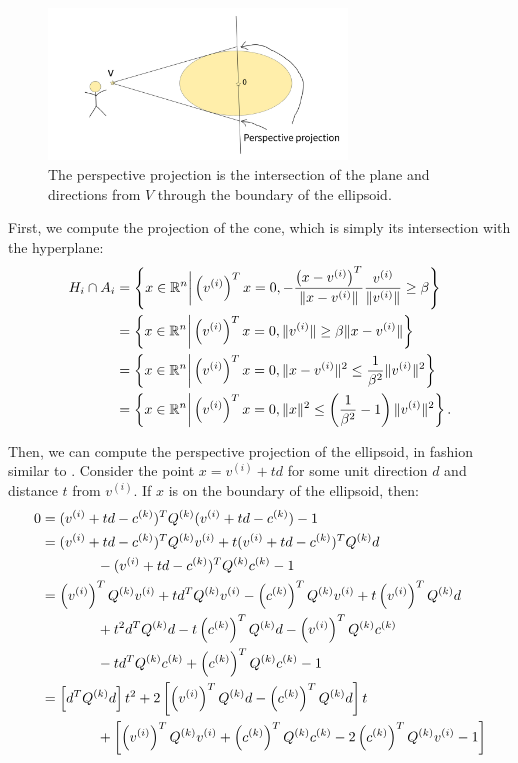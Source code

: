 \begin{figure}[ht]
    \centering
    \includegraphics[width=300px]{images/perspective_projection.png}
    \caption[A depiction of the perspective projection]{
    		The perspective projection is the intersection of the plane and directions from $V$ through the boundary of the ellipsoid.
	}
    \label{perspective_projection_depiction}
\end{figure}

First, we compute the projection of the cone, which is simply its intersection with the hyperplane:
\begin{align*}
H_i \cap A_i 
&= \left\{x \in \mathbb R^n \bigg| \left(v^{(i)}\right)^Tx = 0, -\frac{\left(x - v^{(i)}\right)^T}{\|x - v^{(i)}\|}\frac{v^{(i)}}{\|v^{(i)}\|}\ge \beta \right\} \\
&= \left\{x \in \mathbb R^n \bigg| \left(v^{(i)}\right)^Tx = 0, \|v^{(i)}\|\ge \beta\|x - v^{(i)}\| \right\} \\
&= \left\{x \in \mathbb R^n \bigg| \left(v^{(i)}\right)^Tx = 0, \|x - v^{(i)}\|^2 \le \frac 1 {\beta^2}\|v^{(i)}\|^2 \right\} \\
&= \left\{x \in \mathbb R^n \bigg| \left(v^{(i)}\right)^Tx = 0, \|x\|^2 \le \left(\frac 1 {\beta^2} - 1\right)\|v^{(i)}\|^2 \right\}.
\end{align*}

Then, we can compute the perspective projection of the ellipsoid,  in fashion similar to \cite{eberly_2013}.
Consider the point $x = v^{(i)} + td$ for some unit direction $d$ and distance $t$ from $v^{(i)}$.
If $x$ is on the boundary of the ellipsoid, then:
\begin{align*}
0 &= (v^{(i)} + t d - c^{(k)} )^T {Q^{(k)}}  (v^{(i)} + t d - c^{(k)} ) - 1\\
&= (v^{(i)} + t d - c^{(k)} )^T {Q^{(k)}}  v^{(i)} + t (v^{(i)} + t d - c^{(k)} )^T {Q^{(k)}} d \\ 
&\quad \quad \quad \quad- (v^{(i)} + t d - c^{(k)} )^T {Q^{(k)}} c^{(k)} - 1\\
&= \left(v^{(i)}\right)^T {Q^{(k)}}  v^{(i)} + t d^T {Q^{(k)}}  v^{(i)} - \left(c^{(k)}\right) ^T {Q^{(k)}}  v^{(i)} + t \left(v^{(i)}\right)^T {Q^{(k)}}  d \\
&\quad \quad \quad \quad + t^2 d^T {Q^{(k)}}  d - t \left(c^{(k)}\right)^T {Q^{(k)}}  d - \left(v^{(i)}\right)^T {Q^{(k)}}  c^{(k)}  \\
&\quad \quad \quad \quad - t d^T {Q^{(k)}}  c^{(k)} + \left(c^{(k)}\right) ^T {Q^{(k)}} c^{(k)} - 1\\
&= \left[d^T{Q^{(k)}} d
\right] t^2 + 2\left[
\left(v^{(i)}\right)^T {Q^{(k)}}  d - \left(c^{(k)}\right) ^T{Q^{(k)}} d
\right] t \\
&\quad \quad \quad \quad + \left[
\left(v^{(i)}\right)^T {Q^{(k)}}  v^{(i)} + \left(c^{(k)}\right) ^T {Q^{(k)}}  c^{(k)}  - 2 \left(c^{(k)}\right) ^T {Q^{(k)}}  v^{(i)} - 1
\right]
\end{align*}

